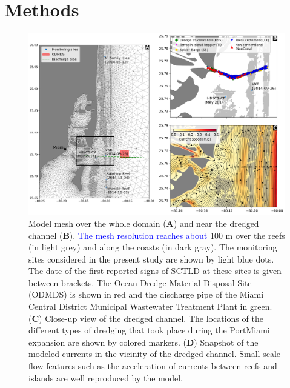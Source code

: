 \documentclass[preprint,12pt,authoryear]{elsarticle}
\newcommand{\modif}[1]{\textcolor{blue}{#1}}
\begin{document}
\section{Methods}

\begin{figure}
	\centering
	\includegraphics[width=\textwidth]{figures/fig_mesh_new.png}
    \caption{Model mesh over the whole domain (\textbf{A}) and near the dredged channel (\textbf{B}). \modif{The mesh resolution reaches about} 100 m over the reefs (in light grey) and along the coasts (in dark gray). The monitoring sites considered in the present study are shown by light blue dots. The date of the first reported signs of SCTLD at these sites is given between brackets. The Ocean Dredge Material Disposal Site (ODMDS) is shown in red and the discharge pipe of the Miami Central District Municipal Wastewater Treatment Plant in green. (\textbf{C}) Close-up view of the dredged channel. The locations of the different types of dredging that took place during the PortMiami expansion are shown by colored markers. (\textbf{D}) Snapshot of the modeled currents in the vicinity of the dredged channel. Small-scale flow features such as the acceleration of currents between reefs and islands are well reproduced by the model.}
	\label{fig:onset_mesh}
\end{figure}
\end{document}

